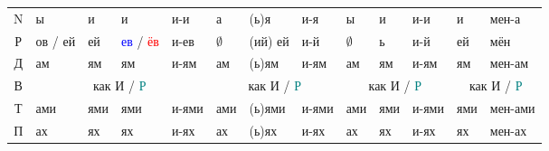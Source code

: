 \documentclass[a4paper, landscape, 11pt]{article}
\newcommand{\an}[1]{\textcolor{teal}{#1}} %
\newcommand{\us}[1]{\textcolor{blue}{#1}} %
\newcommand{\st}[1]{\textcolor{red}{#1}}  %
\begin{document}
\begin{tabularx}{\textwidth}{|c|XXXX|XXX|XXX|XX|}
	  N    & ы                   & и                 & и                 & и-и          & а           & (ь)я     & и-я        & ы           & и                 & и-и        & и                     & мен-а                  \\
	  Р    & ов / ей             & ей                & \us{ев} / \st{ёв} & и-ев         & $\emptyset$ & (ий) ей  & и-й        & $\emptyset$ & ь                 & и-й        & ей                    & мён                    \\
	  Д    & ам                  & ям                & ям                & и-ям         & ам          & (ь)ям    & и-ям       & ам          & ям                & и-ям       & ям                    & мен-ам                 \\ \cline{2-13}
	  В    &                    \multicolumn{4}{c|}{как И / \an{Р}}                     & \multicolumn{3}{c|}{как И / \an{Р}} &     \multicolumn{3}{c|}{как И / \an{Р}}      &      \multicolumn{2}{c|}{как И / \an{Р}}       \\ \cline{2-13}
	  Т    & ами                 & ями               & ями               & и-ями        & ами         & (ь)ями   & и-ями      & ами         & ями               & и-ями      & ями                   & мен-ами                \\
	  П    & ах                  & ях                & ях                & и-ях         & ах          & (ь)ях    & и-ях       & ах          & ях                & и-ях       & ях                    & мен-ах                 \\ \hline
\end{tabularx}
\end{document}
